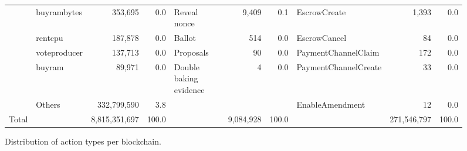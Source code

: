 \begin{figure*}[htbp]
\begin{tabular}{@{}lp{0.7in}rrp{1.2in}rrp{0.9in}rr@{}}
      & buyrambytes &                353,695  &                0.0  & Reveal nonce &            9,409  &         0.1  & EscrowCreate &                 1,393  &         0.0  \\
      & rentcpu &                187,878  &                0.0  & Ballot &                514  &         0.0  & EscrowCancel &                      84  &         0.0  \\
      & voteproducer &                137,713  &                0.0  & Proposals &                  90  &         0.0  & PaymentChannelClaim &                    172  &         0.0  \\
      & buyram &                  89,971  &                0.0  & Double baking evidence &                    4  &         0.0  & PaymentChannelCreate &                      33  &         0.0  \\
      & Others &        332,799,590  &                3.8  &   &   &   & EnableAmendment &                      12  &         0.0  \\
    \midrule
    \midrule
    Total &   &    8,815,351,697  &           100.0  &   &    9,084,928  &    100.0  &   &    271,546,797  &    100.0  \\
    \bottomrule
    \end{tabular}%
    \caption{Distribution of action types per blockchain.}
    \label{tab:transaction-types-distribution}%
\end{figure*}
